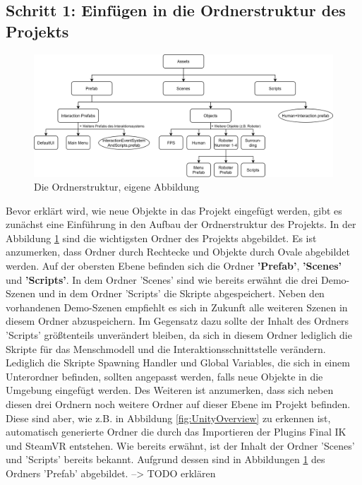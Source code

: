\subsection{Schritt 1: Einfügen in die Ordnerstruktur des Projekts}
\begin{figure}[h]
	\centering
	\includegraphics[width=1\linewidth]{Bilder/A54_Ordnerstruktur}
	\caption{Die Ordnerstruktur, eigene Abbildung}
	\label{fig:Ordnerstruktur}
\end{figure}
\noindent Bevor erklärt wird, wie neue Objekte in das Projekt eingefügt werden, gibt es zunächst eine Einführung in den Aufbau der Ordnerstruktur des Projekts. In der Abbildung \ref{fig:Ordnerstruktur} sind die wichtigsten Ordner des Projekts abgebildet. Es ist anzumerken, dass Ordner durch Rechtecke und Objekte durch Ovale abgebildet werden.
\newline\newline
Auf der obersten Ebene befinden sich die Ordner \textbf{'Prefab'}, \textbf{'Scenes'} und \textbf{'Scripts'}. In dem Ordner 'Scenes' sind wie bereits erwähnt die drei Demo-Szenen und in dem Ordner 'Scripts' die Skripte abgespeichert. Neben den vorhandenen Demo-Szenen empfiehlt es sich in Zukunft alle weiteren Szenen in diesem Ordner abzuspeichern. Im Gegensatz dazu sollte der Inhalt des Ordners 'Scripts' größtenteils unverändert bleiben, da sich in diesem Ordner lediglich die Skripte für das Menschmodell und die Interaktionsschnittstelle verändern. Lediglich die Skripte Spawning Handler und Global Variables, die sich in einem Unterordner befinden, sollten angepasst werden, falls neue Objekte in die Umgebung eingefügt werden. Des Weiteren ist anzumerken, dass sich neben diesen drei Ordnern noch weitere Ordner auf dieser Ebene im Projekt befinden. Diese sind aber, wie z.B. in Abbildung \ref{fig:UnityOverview} zu erkennen ist, automatisch generierte Ordner die durch das Importieren der Plugins Final IK und SteamVR entstehen. 
\newline\newline
Wie bereits erwähnt, ist der Inhalt der Ordner 'Scenes' und 'Scripts' bereits bekannt. Aufgrund dessen sind in Abbildungen \ref{fig:Ordnerstruktur} des Ordners 'Prefab' abgebildet.
--> TODO erklären

